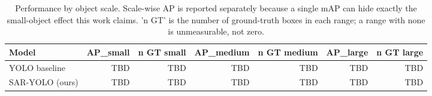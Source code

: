 \begin{table}[t]
\centering
\caption{Performance by object scale. Scale-wise AP is reported separately because a single mAP can hide exactly the small-object effect this work claims. 'n GT' is the number of ground-truth boxes in each range; a range with none is unmeasurable, not zero.}
\label{tab:scale_analysis}
\begin{tabular}{lrrrrrr}
\toprule
Model & AP_small & n GT small & AP_medium & n GT medium & AP_large & n GT large \\
\midrule
YOLO baseline & TBD & TBD & TBD & TBD & TBD & TBD \\
SAR-YOLO (ours) & TBD & TBD & TBD & TBD & TBD & TBD \\
\bottomrule
\end{tabular}
\end{table}
